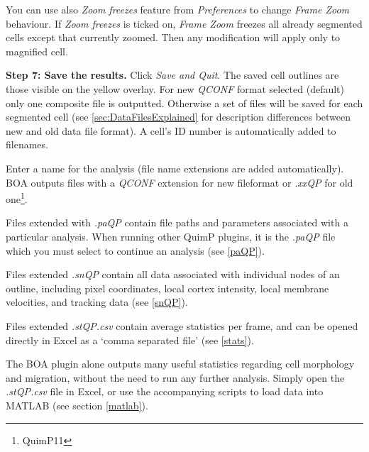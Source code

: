 \documentclass[a4paper,12pt]{article}
\begin{document}
You can use also \textit{Zoom freezes} feature from \textit{Preferences} to change \textit{Frame Zoom} behaviour. If \textit{Zoom freezes} is ticked on, \textit{Frame Zoom} freezes all already segmented cells except that currently zoomed. Then any modification will apply only to magnified cell. 

\textbf{Step 7: Save the results.}  Click \textit{Save and Quit}.  The saved cell outlines are those visible on the yellow overlay. For new \textit{QCONF} format selected (default) only one composite file is outputted. Otherwise a set of files will be saved for each segmented cell (see \autoref{sec:DataFilesExplained} for description differences between new and old data file format). A cell's ID number is automatically added to filenames.

Enter a name for the analysis (file name extensions are added automatically). BOA outputs files with a \textit{QCONF} extension for new fileformat or \textit{.xxQP} for old one\footnote{QuimP11}.

Files extended  with \textit{.paQP} contain file paths and parameters associated with a particular analysis.  
When running other QuimP plugins, it is the \textit{.paQP} file which you must select to continue an analysis (see \autoref{paQP}).

Files extended \textit{.snQP} contain all data associated with individual nodes of an outline, including pixel coordinates, local cortex 
intensity, local membrane velocities, and tracking data (see \autoref{snQP}).

Files extended \textit{.stQP.csv} contain average statistics per frame, and can be opened directly in 
Excel as a `comma separated file'  (see \autoref{stats}).

The BOA plugin alone outputs many useful statistics regarding cell morphology and migration, without the need to run any further analysis.
Simply open the \textit{.stQP.csv} file in Excel, or use the accompanying scripts to load data into MATLAB (see section \autoref{matlab}).
\end{document}
